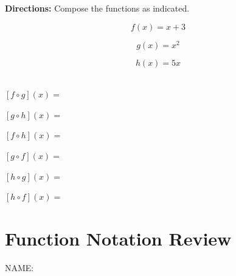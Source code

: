 \documentclass[12pt]{article}
\let\stdsection\section
\renewcommand\section{\newpage\stdsection}
\begin{document}
\textbf{Directions:} Compose the functions as indicated.

\begin{large}
$$ f(x)=x+3$$

$$g(x)=x^2$$

$$h(x)=5x$$\\
\end{large}

\begin{enumerate}
\begin{multicols}{2}

\item $[f \circ g](x)=$\\

	\vspace{1in}

\item $[g \circ h](x)=$\\

	\vspace{1in}


\item $[f \circ h](x)=$\\

	\vspace{1in}

\item $[g \circ f](x)=$\\

	\vspace{1in}

\item $[h \circ g](x)=$\\

	\vspace{1in}

\item $[h \circ f](x)=$\\

	\vspace{1in}

\end{multicols}
\end{enumerate}






\section{Function Notation Review }

\hfill NAME:\underline{\hspace{3in}}
\end{document}
